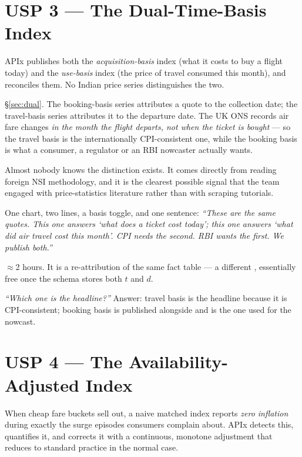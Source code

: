 \section{USP 3 --- The Dual-Time-Basis Index}

\begin{uspbox}
 APIx publishes both the \emph{acquisition-basis} index (what it costs to buy
a flight today) and the \emph{use-basis} index (the price of travel consumed this month),
and reconciles them. No Indian price series distinguishes the two.
\end{uspbox}

 \S\ref{sec:dual}. The booking-basis series attributes a quote to the
collection date; the travel-basis series attributes it to the departure date. The UK ONS
records air fare changes \emph{in the month the flight departs, not when the ticket is
bought} --- so the travel basis is the internationally CPI-consistent one, while the booking
basis is what a consumer, a regulator or an RBI nowcaster actually wants.

 Almost nobody knows the distinction exists. It comes
directly from reading foreign NSI methodology, and it is the clearest possible signal that
the team engaged with price-statistics literature rather than with scraping tutorials.

 One chart, two lines, a basis toggle, and one sentence: \emph{``These
are the same quotes. This one answers `what does a ticket cost today'; this one answers
`what did air travel cost this month'. CPI needs the second. RBI wants the first. We
publish both.''}

 $\approx$2 hours. It is a re-attribution of the same fact table --- a
different , essentially free once the schema stores both $t$ and $d$.

 \emph{``Which one is the headline?''} Answer: travel basis is
the headline because it is CPI-consistent; booking basis is published alongside and is the
one used for the nowcast.

\section{USP 4 --- The Availability-Adjusted Index}

\begin{uspbox}
 When cheap fare buckets sell out, a naive matched index reports \emph{zero
inflation} during exactly the surge episodes consumers complain about. APIx detects this,
quantifies it, and corrects it with a continuous, monotone adjustment that reduces to
standard practice in the normal case.
\end{uspbox}

